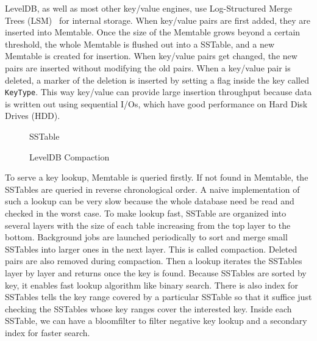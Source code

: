 LevelDB, as well as most other key/value engines, use Log-Structured
Merge Trees (LSM)~\cite{lsm} for internal storage. When key/value
pairs are first added, they are inserted into Memtable.  Once the size
of the Memtable grows beyond a certain threshold, the whole Memtable
is flushed out into a SSTable, and a new Memtable is created for
insertion. When key/value pairs get changed, the new pairs are
inserted without modifying the old pairs. When a key/value pair is
deleted, a marker of the deletion is inserted by setting a flag inside
the key called \texttt{KeyType}. This way key/value can provide large
insertion throughput because data is written out using sequential
I/Os, which have good performance on Hard Disk Drives (HDD). 

\begin{figure}[t]
\begin{centering}
\caption{SSTable}
\label{fig:sstable}
\end{centering}
\end{figure}

\begin{figure}[t]
\begin{centering}
\caption{LevelDB Compaction}
\label{fig:compact}
\end{centering}
\end{figure}

To serve a key lookup, Memtable is queried firstly. If not found in
Memtable, the SSTables are queried in reverse chronological order. A
naive implementation of such a lookup can be very slow because the
whole database need be read and checked in the worst case. To make
lookup fast, SSTable are organized into several layers with the size
of each table increasing from the top layer to the bottom. Background
jobs are launched periodically to sort and merge small SSTables into
larger ones in the next layer. This is called compaction. Deleted
pairs are also removed during compaction. Then a lookup iterates the
SSTables layer by layer and returns once the key is found.  Because
SSTables are sorted by key, it enables fast lookup algorithm like
binary search. There is also index for SSTables tells the key range
covered by a particular SSTable so that it suffice just checking the
SSTables whose key ranges cover the interested key. Inside each
SSTable, we can have a bloomfilter to filter negative key lookup and a
secondary index for faster search.

